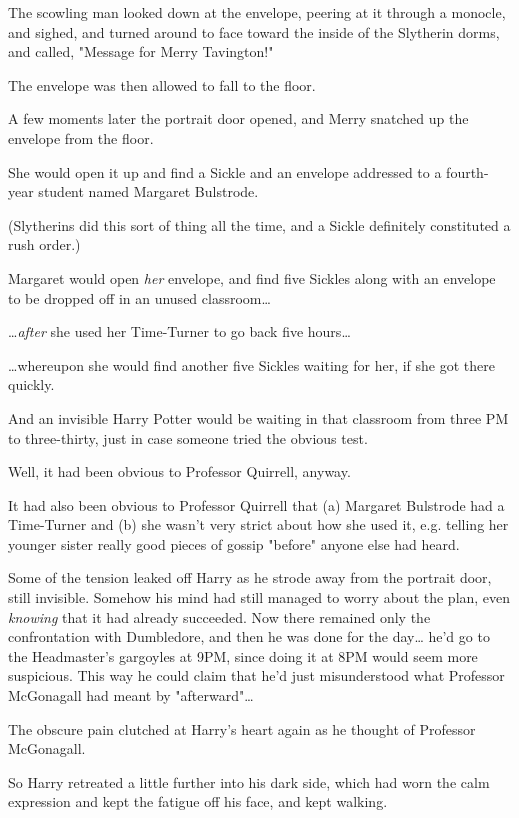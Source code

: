 The scowling man looked down at the envelope, peering at it through a monocle, 
and sighed, and turned around to face toward the inside of the Slytherin dorms, 
and called, "Message for Merry Tavington!"

The envelope was then allowed to fall to the floor.

A few moments later the portrait door opened, and Merry snatched up the 
envelope from the floor.

She would open it up and find a Sickle and an envelope addressed to a 
fourth-year student named Margaret Bulstrode.

(Slytherins did this sort of thing all the time, and a Sickle definitely 
constituted a rush order.)

Margaret would open \emph{her} envelope, and find five Sickles along with an 
envelope to be dropped off in an unused classroom{\ldots}

{\ldots}\emph{after} she used her Time-Turner to go back five hours{\ldots}

{\ldots}whereupon she would find another five Sickles waiting for her, if she 
got there quickly.

And an invisible Harry Potter would be waiting in that classroom from three PM 
to three-thirty, just in case someone tried the obvious test.

Well, it had been obvious to Professor Quirrell, anyway.

It had also been obvious to Professor Quirrell that (a) Margaret Bulstrode had 
a Time-Turner and (b) she wasn't very strict about how she used it, e.g. 
telling her younger sister really good pieces of gossip "before" anyone else 
had heard.

Some of the tension leaked off Harry as he strode away from the portrait door, 
still invisible. Somehow his mind had still managed to worry about the plan, 
even\emph{ knowing} that it had already succeeded. Now there remained only the 
confrontation with Dumbledore, and then he was done for the day{\ldots} he'd go 
to the Headmaster's gargoyles at 9PM, since doing it at 8PM would seem more 
suspicious. This way he could claim that he'd just misunderstood what Professor 
McGonagall had meant by "afterward"{\ldots}

The obscure pain clutched at Harry's heart again as he thought of Professor 
McGonagall.

So Harry retreated a little further into his dark side, which had worn the calm 
expression and kept the fatigue off his face, and kept walking.

